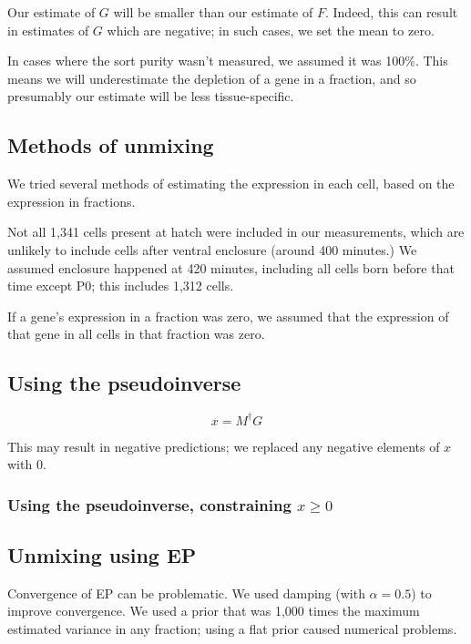 \documentclass{article}
\begin{document}
Our estimate of $G$ will be smaller than our estimate of $F$.
Indeed, this can result in estimates of $G$ which are negative; in such
cases, we set the mean to zero.

In cases where the sort purity wasn't measured, we assumed it was 100\%.
This means we will underestimate the depletion of a gene in a fraction,
and so presumably our estimate will be less tissue-specific.

\newpage

\subsection*{Methods of unmixing}

We tried several methods of estimating the expression in each cell, based
on the expression in fractions.

Not all 1,341 cells present at hatch were included in our measurements,
which are unlikely to include cells after ventral enclosure (around 400 minutes.)
We assumed enclosure happened at 420 minutes, including all cells born
before that time except P0; this includes 1,312 cells.

If a gene's expression in a fraction was zero, we assumed that the expression
of that gene in all cells in that fraction was zero.

\subsection*{Using the pseudoinverse}

\[
x = M^\dagger G
\]

This may result in negative predictions; we replaced any negative elements
of $x$ with 0.

\subsubsection*{Using the pseudoinverse, constraining $x \ge 0$}



\subsection*{Unmixing using EP}





Convergence of EP can be problematic. We 
used damping (with $\alpha = 0.5$) to improve convergence.
We used a prior that was 1,000 times the maximum estimated variance
in any fraction; using a flat
prior caused numerical problems.
\end{document}
